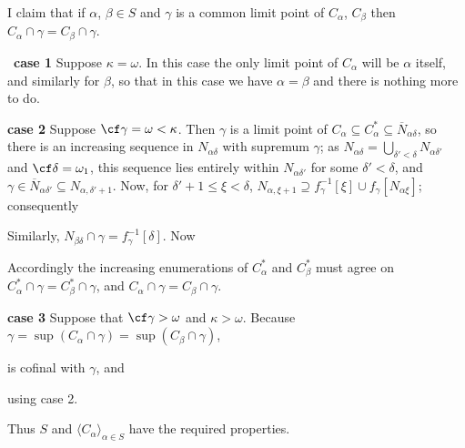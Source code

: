 {I claim that if $\alpha$, $\beta\in S$ and $\gamma$
is a common limit point of $C_{\alpha}$, $C_{\beta}$ then
$C_{\alpha}\cap\gamma=C_{\beta}\cap\gamma$.

\Prf\ {\bf case 1} Suppose $\kappa=\omega$.   In this case the only
limit point of $C_{\alpha}$
will be $\alpha$ itself, and similarly for $\beta$, so that in this
case
we have $\alpha=\beta$ and there is nothing more to do.

{\bf case 2} Suppose $\cf\gamma=\omega<\kappa$.
Then $\gamma$ is a limit point of
$C_{\alpha}\subseteq C^*_{\alpha}\subseteq\overline{N}_{\alpha\delta}$, so
there is an increasing sequence in $N_{\alpha\delta}$ with supremum
$\gamma$;  as
$N_{\alpha\delta}=\bigcup_{\delta'<\delta}N_{\alpha\delta'}$ and
$\cf\delta=\omega_1$, this sequence lies entirely within
$N_{\alpha\delta'}$ for some $\delta'<\delta$, and
$\gamma\in\overline{N}_{\alpha\delta'}\subseteq N_{\alpha,\delta'+1}$.
Now, for $\delta'+1\le\xi<\delta$, $N_{\alpha,\xi+1}
\supseteq f_{\gamma}^{-1}[\xi]\cup f_{\gamma}[N_{\alpha\xi}]$;
consequently


\noindent Similarly,
$N_{\beta\delta}\cap\gamma=f_{\gamma}^{-1}[\delta]$.   Now


\noindent Accordingly the increasing enumerations of $C^*_{\alpha}$ and
$C^*_{\beta}$ must agree on
$C^*_{\alpha}\cap\gamma=C^*_{\beta}\cap\gamma$, and
$C_{\alpha}\cap\gamma=C_{\beta}\cap\gamma$.

{\bf case 3} Suppose that $\cf\gamma>\omega$ and $\kappa>\omega$.
Because $\gamma=\sup(C_{\alpha}\cap\gamma)=\sup(C_{\beta}\cap\gamma)$,


\noindent is cofinal with $\gamma$, and


\noindent using case 2.\ \Qed

Thus $S$ and $\langle C_{\alpha}\rangle_{\alpha\in S}$ have
the required properties.
}%

